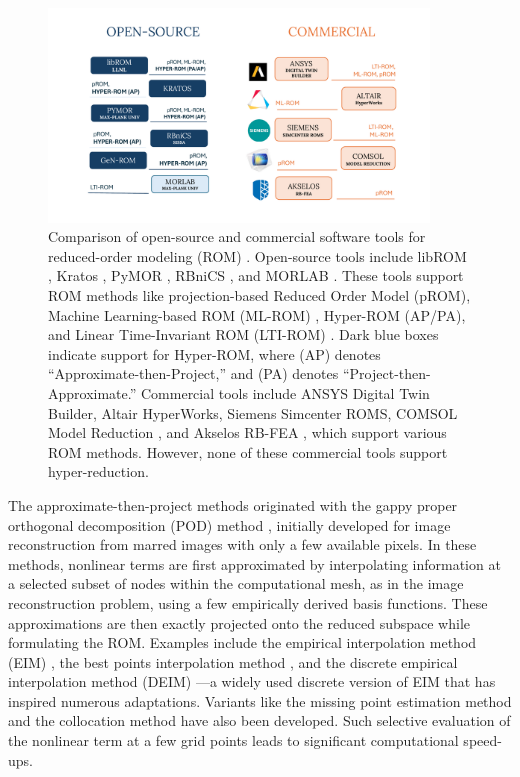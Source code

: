 \documentclass[11pt]{article}
\begin{document}
    \begin{figure}[t]
            \centering
            \includegraphics[width=0.9\textwidth]{software_survey5.pdf}
            \caption{Comparison of open-source and commercial software tools for reduced-order modeling (ROM) \protect\footnotemark. Open-source tools include libROM \cite{Choi2019libROM}, Kratos \cite{vicente_mataix_ferrandiz_2022_6395887}, PyMOR \cite{milk2016pymor}, RBniCS \cite{RozzaBallarinScandurraPichi2024}, and MORLAB \cite{BenW21c}. These tools support ROM methods like projection-based Reduced Order Model (pROM), Machine Learning-based ROM (ML-ROM) \cite{Drakoulas_2023,TANNOUS_2024}, Hyper-ROM (AP/PA), and Linear Time-Invariant ROM (LTI-ROM) \cite{Sikander_2017}. Dark blue boxes indicate support for Hyper-ROM, where (AP) denotes ``Approximate-then-Project,'' and (PA) denotes ``Project-then-Approximate.'' Commercial tools include ANSYS Digital Twin Builder, Altair HyperWorks, Siemens Simcenter ROMS, COMSOL Model Reduction \cite{saha2019reduced,deng2021reduced-order,Zhang_2021}, and Akselos RB-FEA \cite{Di_Nicola_2024,Sharma_2018,BRENNER_2023}, which support various ROM methods. However, none of these commercial tools support hyper-reduction.}
            \label{fig:ROM_software}
    \end{figure}

    The approximate-then-project methods originated with the gappy proper orthogonal decomposition (POD) method \cite{everson1995karhunen--loeve}, initially developed for image reconstruction from marred images with only a few available pixels.
    In these methods, nonlinear terms are first approximated by interpolating information at a selected subset of nodes within the computational mesh, as in the image reconstruction problem, using a few empirically derived basis functions.
    These approximations are then exactly projected onto the reduced subspace while formulating the ROM.
    Examples include the empirical interpolation method (EIM) \cite{Hesthaven2016,barrault2004empirical}, the best points interpolation method \cite{nguyen2007best}, and the discrete empirical interpolation method (DEIM) \cite{chaturantabut2010nonlinear}—a widely used discrete version of EIM that has inspired numerous adaptations.
    Variants like the missing point estimation method and the collocation method \cite{astrid2008missing,gomez2016variational} have also been developed.
    Such selective evaluation of the nonlinear term at a few grid points leads to significant computational speed-ups.
\end{document}

